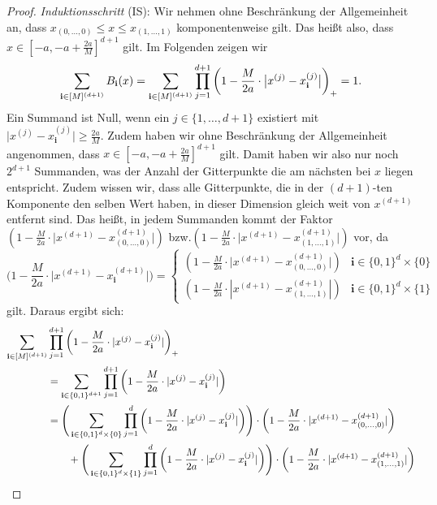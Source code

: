 \begin{proof}
\emph{Induktionsschritt} (IS): Wir nehmen ohne Beschränkung der Allgemeinheit an, dass $x_{(0,\dots,0)} \leq x \leq x_{(1,\dots,1)}$ komponentenweise gilt. Das heißt also, dass $x \in [-a, -a + \frac{2a}{M}]^{d + 1}$ gilt. Im Folgenden zeigen wir $$\sum_{\mathbf{i} \in [M]^{(d + 1)}} B_{\mathbf{i}}(x) = \sum_{\mathbf{i} \in [M]^{(d + 1)}}\prod_{j = 1}^{d + 1} \bigg(1 - \frac{M}{2a} \cdot \big|x^{(j)} - x_{\mathbf{i}}^{(j)}\big|\bigg)_+ = 1.$$
Ein Summand ist Null, wenn ein $j \in \{1,\dots,d+1\}$ existiert mit $\big|x^{(j)} - x_{\mathbf{i}}^{(j)}\big| \geq \frac{2a}{M}$. Zudem haben wir ohne Beschränkung der Allgemeinheit angenommen, dass $x \in [-a, -a + \frac{2a}{M}]^{d + 1}$ gilt. Damit haben wir also nur noch $2^{d + 1}$ Summanden, was der Anzahl der Gitterpunkte die am nächsten bei $x$ liegen entspricht. Zudem wissen wir, dass alle Gitterpunkte, die in der $(d + 1)$-ten Komponente den selben Wert haben, in dieser Dimension gleich weit von $x^{(d + 1)}$ entfernt sind. Das heißt, in jedem Summanden kommt der Faktor $(1 - \frac{M}{2a} \cdot \big|x^{(d + 1)} - x_{(0,\dots,0)}^{(d + 1)}\big|)$ bzw.\@ $(1 - \frac{M}{2a} \cdot \big|x^{(d + 1)} - x_{(1,\dots,1)}^{(d + 1)}\big|)$ vor, da 
\begin{equation*}
\bigg(1 - \frac{M}{2a} \cdot \Big|x^{(d + 1)} - x_\mathbf{i}^{(d + 1)}\Big|\bigg) = \begin{cases}
(1 - \frac{M}{2a} \cdot \big|x^{(d + 1)} - x_{(0,\dots,0)}^{(d + 1)}\big|) &\text{$\mathbf{i} \in \{0, 1\}^d \times \{0\}$}\\
(1 - \frac{M}{2a} \cdot |x^{(d + 1)} - x_{(1,\dots,1)}^{(d + 1)}|) &\text{$\mathbf{i} \in \{0, 1\}^d \times \{1\}$}
\end{cases}
\end{equation*}
gilt. Daraus ergibt sich:
\begin{equation*}
\begin{split}
\sum_{\bi \in [M]^{(d + 1)}} & \prod_{j = 1}^{d + 1} \bigg(1 - \frac{M}{2a} \cdot |x^{(j)} - x_{\mathbf{i}}^{(j)}|\bigg)_+ \\
& = \sum_{\mathbf{i} \in \{0, 1\}^{d + 1}} \prod_{j = 1}^{d + 1} \bigg(1 - \frac{M}{2a} \cdot |x^{(j)} - x_{\bi}^{(j)}|\bigg) \\
& = \Bigg(\sum_{\mathbf{i} \in \{0, 1\}^d \times \{0\}} \prod_{j = 1}^{d} \bigg(1 - \frac{M}{2a} \cdot |x^{(j)} - x_{\bi}^{(j)}|\bigg)\Bigg) \cdot \bigg(1 - \frac{M}{2a} \cdot |x^{(d + 1)} - x_{(0,\dots,0)}^{(d + 1)}|\bigg) \\
& \qquad + \Bigg(\sum_{\mathbf{i} \in \{0, 1\}^d \times \{1\}} \prod_{j = 1}^{d} \bigg(1 - \frac{M}{2a} \cdot |x^{(j)} - x_{\bi}^{(j)}|\bigg)\Bigg) \cdot \bigg(1 - \frac{M}{2a} \cdot |x^{(d + 1)} - x_{(1,\dots,1)}^{(d + 1)}|\bigg) \\

\end{split}
\end{equation*}
\end{proof}
